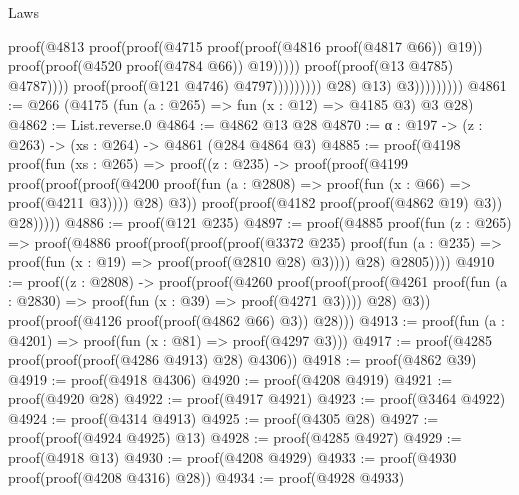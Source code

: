 \begin{lexlean}{Laws}
\begin{coremodule}
                                                            proof(@4813
                                                                proof(proof(@4715
                                                                      proof(proof(@4816
                                                                            proof(@4817 @66))
                                                                          @19))
                                                                    proof(proof(@4520
                                                                          proof(@4784 @66))
                                                                        @19)))))
                                                        proof(proof(@13 @4785) @4787))))
                                              proof(proof(@121 @4746) @4797)))))))))
                          @28)
                        @13)
                      @3)))))))))
@4861 := @266 (@4175 (fun (a : @265) => fun (x : @12) => @4185 @3) @3 @28)
@4862 := List.reverse.{0}
@4864 := @4862 @13 @28
@4870 := {α : @197} -> (z : @263) -> (xs : @264) -> @4861 (@284 @4864 @3)
@4885 := proof(@4198
      proof(fun (xs : @265) =>
        proof((z : @235) ->
          proof(proof(@4199
                proof(proof(proof(@4200
                        proof(fun (a : @2808) => proof(fun (x : @66) => proof(@4211 @3))))
                      @28)
                    @3))
              proof(proof(@4182 proof(proof(@4862 @19) @3)) @28)))))
@4886 := proof(@121 @235)
@4897 := proof(@4885
      proof(fun (z : @265) =>
        proof(@4886
            proof(proof(proof(proof(@3372 @235)
                    proof(fun (a : @235) => proof(fun (x : @19) => proof(proof(@2810 @28) @3))))
                  @28)
                @2805))))
@4910 := proof((z : @2808) ->
    proof(proof(@4260
          proof(proof(proof(@4261 proof(fun (a : @2830) => proof(fun (x : @39) => proof(@4271 @3))))
                @28)
              @3))
        proof(proof(@4126 proof(proof(@4862 @66) @3)) @28)))
@4913 := proof(fun (a : @4201) => proof(fun (x : @81) => proof(@4297 @3)))
@4917 := proof(@4285 proof(proof(proof(@4286 @4913) @28) @4306))
@4918 := proof(@4862 @39)
@4919 := proof(@4918 @4306)
@4920 := proof(@4208 @4919)
@4921 := proof(@4920 @28)
@4922 := proof(@4917 @4921)
@4923 := proof(@3464 @4922)
@4924 := proof(@4314 @4913)
@4925 := proof(@4305 @28)
@4927 := proof(proof(@4924 @4925) @13)
@4928 := proof(@4285 @4927)
@4929 := proof(@4918 @13)
@4930 := proof(@4208 @4929)
@4933 := proof(@4930 proof(proof(@4208 @4316) @28))
@4934 := proof(@4928 @4933)

\end{coremodule}
\end{lexlean}
